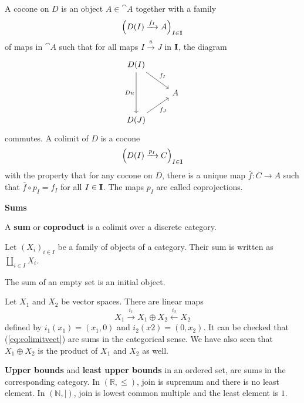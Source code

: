 A cocone on $D$ is an object $A\in\cat{A}$ together with a family
\begin{equation*}
    \Big( D(I)\xrightarrow{f_I} A \Big)_{I\in\mathbf{I}}
\end{equation*}
of maps in $\cat{A}$ such that for all maps $I\xrightarrow{u}J$ in $\mathbf{I}$, the diagram
\begin{equation*}
\begin{tikzcd}
    D(I) \arrow[dr, "f_I"] \arrow[dd, "Du"'] \\
    & A \\
    D(J) \arrow[ur, "f_J"']
\end{tikzcd}
\end{equation*}
commutes. A colimit of $D$ is a cocone
\begin{equation*}
    \Big( D(I)\xrightarrow{p_I} C \Big)_{I\in\mathbf{I}}
\end{equation*}
with the property that for any cocone on $D$, there is a unique map $\bar{f}:C\to A$ such that $\bar{f}\circ p_I=f_I$ for all $I\in\mathbf{I}$. The maps $p_I$ are called coprojections.

\begin{center}
    \textbf{Sums}
\end{center}
\begin{definition}
    A \textbf{sum} or \textbf{coproduct} is a colimit over a discrete category.
\end{definition}
Let $(X_i)_{i\in I}$ be a family of objects of a category. Their sum is written as $\coprod_{i\in I}X_i$.\par

The sum of an empty set is an initial object.

\begin{example}
    Let $X_1$ and $X_2$ be vector spaces. There are linear maps
    \begin{equation}\label{eq:colimitvect}
        X_1 \xrightarrow{i_1} X_1 \oplus X_2 \xleftarrow{i_2} X_2
    \end{equation}
    defined by $i_1(x_1)=(x_1,0)$ and $i_2(x2)=(0,x_2)$. It can be checked that (\ref{eq:colimitvect}) are sums in the categorical sense. We have also seen that $X_1\oplus X_2$ is the product of $X_1$ and $X_2$ as well.
\end{example}

\begin{example}
    \textbf{Upper bounds} and \textbf{least upper bounds} in an ordered set, are sums in the corresponding category. In $(\mathbb{R},\leq)$, join is supremum and there is no least element. In $(\mathbb{N},\vert)$, join is lowest common multiple and the least element is $1$.
\end{example}

